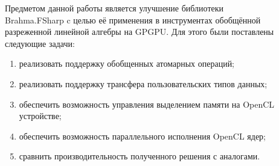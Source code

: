 \label{sec:task}
Предметом данной работы является улучшение библиотеки \\ Brahma.FSharp c целью её применения в инструментах обобщённой разреженной линейной алгебры на GPGPU. Для этого были поставлены следующие задачи:
 \begin{enumerate}
 \item реализовать поддержку обобщенных атомарных операций;
 \item реализовать поддержку трансфера пользовательских типов данных;
 \item обеспечить возможность управления выделением памяти на OpenCL устройстве;
 \item обеспечить возможность параллельного исполнения OpenCL ядер;
 \item сравнить производительность полученного решения с аналогами.
 \end{enumerate}
